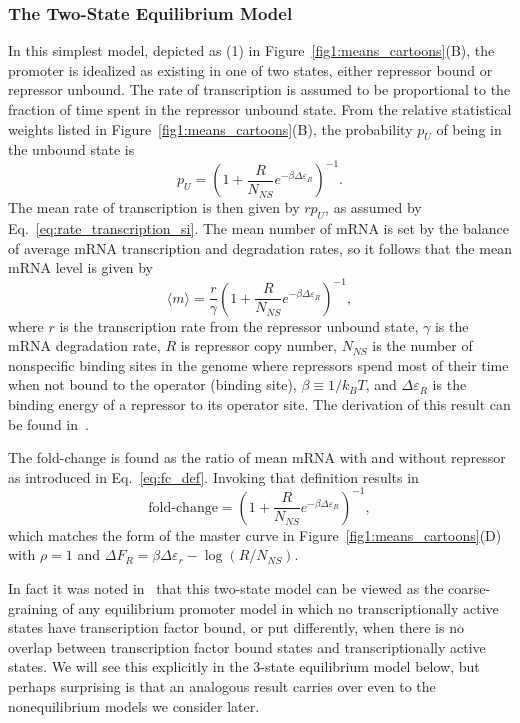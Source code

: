 \subsubsection{The Two-State Equilibrium Model}
In this simplest model, depicted as (1) in Figure~\ref{fig1:means_cartoons}(B),
the promoter is idealized as existing in one of two states, either repressor
bound or repressor unbound. The rate of transcription
is assumed to be proportional to the fraction of time spent
in the repressor unbound state.
From the relative statistical weights listed in
Figure~\ref{fig1:means_cartoons}(B), the probability $p_U$ of being in the
unbound state is
\begin{equation}
p_U = \left(1 + \frac{R}{N_{NS}} e^{-\beta\Delta\varepsilon_R}\right)^{-1}.
\end{equation}
The mean rate of transcription is then given by $r p_U$, as assumed by
Eq.~\ref{eq:rate_transcription_si}. The mean number of mRNA is
set by the balance of average mRNA transcription and degradation rates,
so it follows that the mean mRNA level is given by
\begin{equation}
\langle m \rangle = \frac{r}{\gamma}
        \left(1 + \frac{R}{N_{NS}} e^{-\beta\Delta\varepsilon_R}\right)^{-1},
\end{equation}
where $r$ is the transcription rate from the repressor unbound state, $\gamma$
is the mRNA degradation rate, $R$ is repressor copy number, $N_{NS}$ is the
number of nonspecific binding sites in the genome where repressors spend most of
their time when not bound to the operator (binding site), $\beta \equiv 1/k_BT$,
and $\Delta\varepsilon_R$ is the binding energy of a repressor to its operator
site. The derivation of this result can be found in~\cite{Phillips2015a}.

The fold-change is  found as the ratio of mean mRNA with and without repressor
as introduced in Eq.~\ref{eq:fc_def}. Invoking that definition results in
\begin{equation}
\text{fold-change}
= \left(1 + \frac{R}{N_{NS}} e^{-\beta\Delta\varepsilon_R}\right)^{-1},
\end{equation}
which matches the form of the master curve in
Figure~\ref{fig1:means_cartoons}(D) with $\rho=1$ and $\Delta F_R = 
\beta\Delta\varepsilon_r - \log (R / N_{NS})$.

In fact it was noted in~\cite{Chure2019} that this two-state model can be viewed
as the coarse-graining of any equilibrium promoter model in which no
transcriptionally active states have transcription factor bound, or put
differently, when there is no overlap between transcription factor bound states
and transcriptionally active states. We will see this explicitly in the 3-state
equilibrium model below, but perhaps surprising is that an analogous result
carries over even to the nonequilibrium models we consider later.


